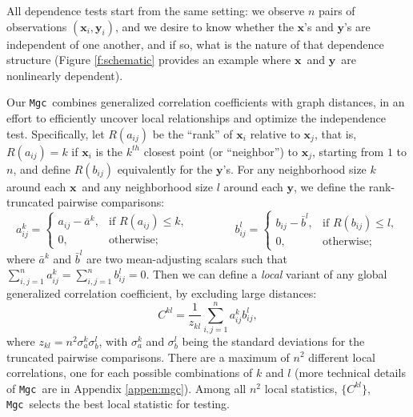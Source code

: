 \documentclass[11pt]{article}
\providecommand{\sct}[1]{{\sc \texttt{#1}}}
\providecommand{\mb}[1]{\boldsymbol{#1}}
\newcommand{\G}{C}
\newcommand{\Mgc}{\sct{Mgc}}
\newcommand{\mbx}{\ensuremath{\mb{x}}}
\newcommand{\mby}{\ensuremath{\mb{y}}}
\begin{document}
All dependence tests start from the same setting: we observe $n$ pairs of observations $(\mbx_i,\mby_i)$, and we desire to know whether the \mbx's and \mby's are independent of one another, and if so, what is the nature of that dependence structure (Figure \ref{f:schematic} provides an example where \mbx~and \mby~are nonlinearly dependent).


Our \Mgc~combines generalized correlation coefficients with  graph distances, in an effort to efficiently uncover local relationships and optimize the independence test.  Specifically, let $R(a_{ij})$  be the ``rank'' of $\mbx_i$ relative to $\mbx_j$, that is, $R(a_{ij})=k$ if $\mbx_i$ is the $k^{th}$ closest point (or ``neighbor'') to $\mbx_j$, starting from $1$ to $n$, and  define $R(b_{ij})$ equivalently for the \mby's. For any neighborhood size $k$ around each \mbx~and any neighborhood size $l$ around each \mby, we define the rank-truncated pairwise comparisons:
\begin{equation}
\label{localCoef2}
    a_{ij}^k=
    \begin{cases}
      a_{ij}-\bar{a}^{k}, & \text{if } R(a_{ij}) \leq k, \\
      0, & \text{otherwise};
    \end{cases} \qquad \qquad
    b_{ij}^l=
    \begin{cases}
      b_{ij}-\bar{b}^{l}, & \text{if } R(b_{ij}) \leq l, \\
      0, & \text{otherwise};
    \end{cases}
\end{equation}
where $\bar{a}^{k}$ and $\bar{b}^{l}$ are two mean-adjusting scalars such that $\sum_{i,j=1}^{n} a_{ij}^k = \sum_{i,j=1}^{n} b_{ij}^l=0$. Then we can define a \emph{local} variant of any global generalized correlation coefficient, by  excluding large distances: %
\begin{equation}
\label{localCoef}
\G^{kl}=\dfrac{1}{z_{kl}} {\textstyle \sum_{i,j=1}^n a_{ij}^k b_{ij}^l},
\end{equation}
where $z_{kl}=n^2 \sigma_a^k \sigma_b^l$,  with $\sigma_a^k$ and $\sigma_b^{l}$ being the standard deviations for the truncated pairwise comparisons. There are a maximum of $n^2$ different local correlations, one for each possible combinations of $k$ and $l$ (more technical details of \Mgc~are in Appendix \ref{appen:mgc}).
Among all $n^2$ local statistics, $\{\G^{kl}\}$, \Mgc~selects the best local statistic for testing. %
\end{document}

